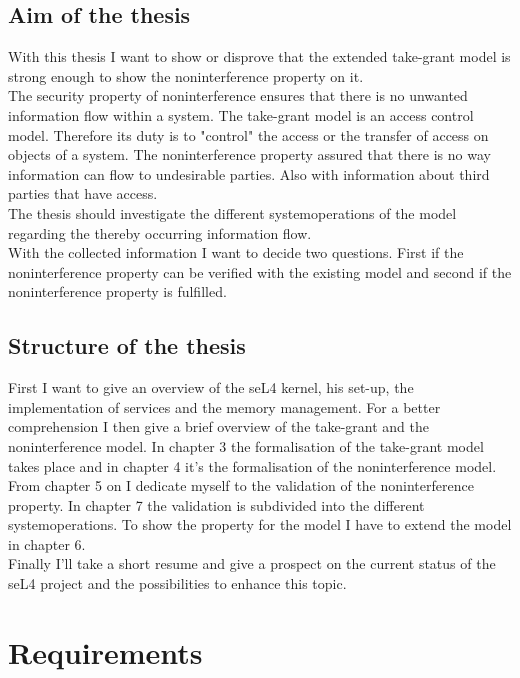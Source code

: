 \documentclass[pdftex,11pt,a4paper,twoside]{article}
\begin{document}
	\subsection{Aim of the thesis}
	With this thesis I want to show or disprove that the extended take-grant model is strong enough to show the noninterference property on it. \\
	The security property of noninterference ensures that there is no unwanted information flow within a system. The take-grant model is an access control model. Therefore its duty is to "control" the access or the transfer of access on objects of a system. The noninterference property assured that there is no way information can flow to undesirable parties. Also with information about third parties that have access. \\
The thesis should investigate the different systemoperations of the model regarding the thereby occurring information flow. \\
With the collected information I want to decide two questions. First if the noninterference property can be verified with the existing model and second if the noninterference property is fulfilled. 
\subsection{Structure of the thesis}
First I want to give an overview of the seL4 kernel, his set-up, the implementation of services and the memory management. For a better comprehension I then give a brief overview of the take-grant and the noninterference model. 
In chapter 3 the formalisation of the take-grant model takes place and in chapter 4 it's the formalisation of the noninterference model. \\
From chapter 5 on I dedicate myself to the validation of the noninterference property. In chapter 7 the validation is subdivided into the different systemoperations. To show the property for the model I have to extend the model in chapter 6. \\
Finally I'll take a short resume and give a prospect on the current status of the seL4 project and the possibilities to enhance this topic. 
	\clearpage
	
	\section{Requirements}
\end{document}
